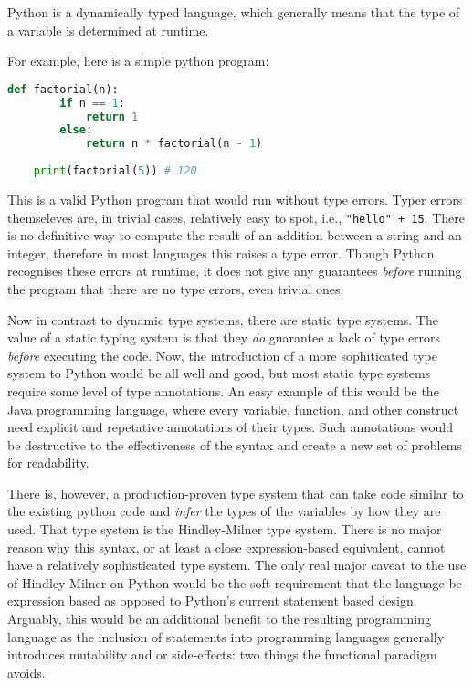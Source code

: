 \documentclass{l4proj}
\begin{document}

Python is a dynamically typed language, which generally means that the type of a variable is determined at runtime.

For example, here is a simple python program:
\begin{lstlisting}[language=Python, caption=A simple python program to find the factorial of a given number (n).]
    def factorial(n):
        if n == 1:
            return 1
        else:
            return n * factorial(n - 1)
    
    print(factorial(5)) # 120
\end{lstlisting}

This is a valid Python program that would run without type errors.
Typer errors themseleves are, in trivial cases, relatively easy to spot, i.e., \texttt{"hello" + 15}.
There is no definitive way to compute the result of an addition between a string and an integer, therefore in most languages this raises a type error. 
Though Python recognises these errors at runtime, it does not give any guarantees \emph{before} running the program that there are no type errors, even trivial ones.

Now in contrast to dynamic type systems, there are static type systems.
The value of a static typing system is that they \emph{do} guarantee a lack of type errors \emph{before} executing the code.
Now, the introduction of a more sophiticated type system to Python would be all well and good, but most static type systems require some level of type annotations.
An easy example of this would be the Java programming language, where every variable, function, and other construct need explicit and repetative annotations of their types.
Such annotations would be destructive to the effectiveness of the syntax and create a new set of problems for readability.

There is, however, a production-proven type system that can take code similar to the existing python code and \emph{infer} the types of the variables by how they are used.
That type system is the Hindley-Milner type system.
There is no major reason why this syntax, or at least a close expression-based equivalent, cannot have a relatively sophisticated type system.
The only real major caveat to the use of Hindley-Milner on Python would be the soft-requirement that the language be expression based as opposed to Python's current statement based design.
Arguably, this would be an additional benefit to the resulting programming language as the inclusion of statements into programming languages generally introduces mutability and or side-effects: two things the functional paradigm avoids.
\end{document}
